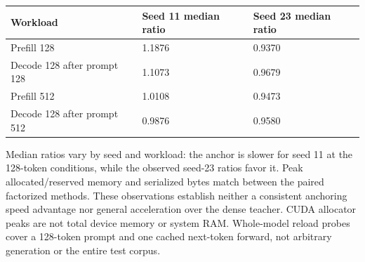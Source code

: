 \documentclass[conference]{IEEEtran}
\begin{document}
{\scriptsize\setlength{\tabcolsep}{2pt}
\noindent\begin{tabular}{@{}p{}p{}p{}@{}}\toprule
Workload & Seed 11 median ratio & Seed 23 median ratio \\
\midrule
Prefill 128 & 1.1876 & 0.9370 \\
Decode 128 after prompt 128 & 1.1073 & 0.9679 \\
Prefill 512 & 1.0108 & 0.9473 \\
Decode 128 after prompt 512 & 0.9876 & 0.9580 \\
\bottomrule\end{tabular}}\par\medskip
Median ratios vary by seed and workload: the anchor is slower for seed 11 at the 128-token conditions, while the observed seed-23 ratios favor it. Peak allocated/reserved memory and serialized bytes match between the paired factorized methods. These observations establish neither a consistent anchoring speed advantage nor general acceleration over the dense teacher. CUDA allocator peaks are not total device memory or system RAM. Whole-model reload probes cover a 128-token prompt and one cached next-token forward, not arbitrary generation or the entire test corpus.\par\smallskip
\end{document}
